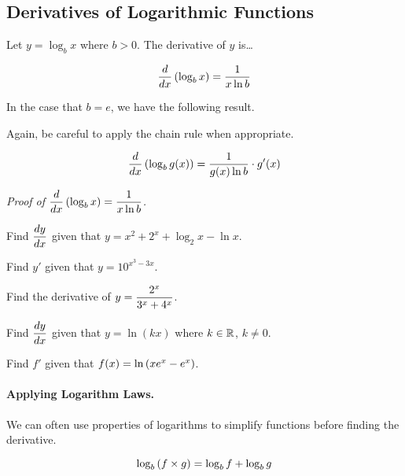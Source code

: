 \documentclass[12pt]{article}
\begin{document}
\newpage

\subsection*{Derivatives of Logarithmic Functions}

Let $y=\log_b x$ where $b>0$. The derivative of $y$ is\dots

$$\frac{d}{dx}\left(\log_b x\right)=\frac{1}{x\ln b}$$

\vspace{3mm}

In the case that $b=e$, we have the following result.

\vspace{20mm}

Again, be careful to apply the chain rule when appropriate.

$$\frac{d}{dx}\left(\log_b g(x)\right)=\frac{1}{g(x)\ln b}\cdot g'(x)$$

\vspace{5mm}

\textit{Proof of $\displaystyle\frac{d}{dx}\left(\log_b x\right)=\frac{1}{x\ln b}$.}

\vspace{50mm}

\Example Find $\displaystyle\frac{dy}{dx}$ given that $y=x^2+2^x+\log_2 x-\ln x$.

\vspace{30mm}

\Example Find $y'$ given that $y=10^{x^3-3x}$.

\newpage

\Example Find the derivative of $y=\displaystyle\frac{2^x}{3^x+4^x}$.

\vspace{60mm}

\Example Find $\displaystyle\frac{dy}{dx}$ given that $y=\ln(kx)$ where $k\in\mathbb{R}$, $k\neq 0$.

\vspace{60mm}

\Example Find $f'$ given that $f(x)=\ln\left( xe^x-e^x\right)$.

\newpage

\paragraph{Applying Logarithm Laws.} We can often use properties of logarithms to simplify functions before finding the derivative.

$$\log_b\left( f\times g\right)=\log_b f+\log_b g$$
\end{document}
